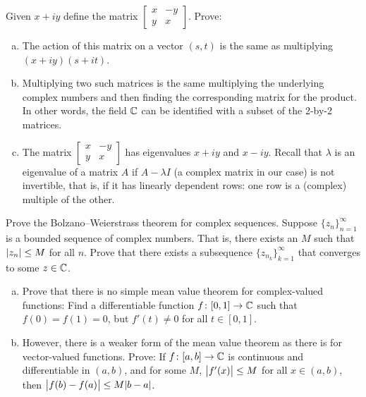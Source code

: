 \begin{samepage}
\begin{exercise}
Given $x +iy$ define the matrix
$\left[ \begin{smallmatrix} x & -y \\ y & x \end{smallmatrix} \right]$.
Prove:
\begin{enumerate}[a)]
\item
The action of this matrix on a vector $(s,t)$ is the same
as multiplying $(x+iy)(s+it)$.
\item
Multiplying two such matrices is the same multiplying the underlying complex
numbers and then finding the corresponding matrix for the product.
In other words, the field ${\mathbb{C}}$ can be identified with a subset of the 2-by-2 matrices.
\item
The matrix
$\left[ \begin{smallmatrix} x & -y \\ y & x \end{smallmatrix} \right]$
has eigenvalues $x+iy$ and $x-iy$.  Recall that $\lambda$ is
an eigenvalue of a matrix $A$ if $A-\lambda I$ (a complex matrix in our case)
is not invertible, that is,
if it has linearly dependent rows: one row is a (complex) multiple
of the other.
\end{enumerate}
\end{exercise}
\end{samepage}

\begin{exercise}
Prove the Bolzano--Weierstrass theorem for complex sequences.
Suppose $\{ z_n \}_{n=1}^\infty$ is a bounded sequence of complex numbers.
That is, there exists an $M$ such that $\lvert {z_n} \rvert \leq M$ for all $n$.
Prove that there exists a subsequence $\{ z_{n_k} \}_{k=1}^\infty$
that converges to some $z \in {\mathbb{C}}$.
\end{exercise}

\begin{exercise}
\leavevmode
\begin{enumerate}[a)]
\item
Prove that there is no simple mean value theorem for complex-valued
functions:  Find a differentiable function $f \colon [0,1] \to {\mathbb{C}}$ such that
$f(0) = f(1) = 0$, but $f'(t) \neq 0$ for all $t \in [0,1]$.
\item
However, there is a weaker form of the mean value theorem as there is for vector-valued
functions.  Prove: If $f \colon [a,b] \to {\mathbb{C}}$ is continuous and differentiable in
$(a,b)$, and for some $M$, $\bigl\lvert {f'(x)} \bigr\rvert \leq M$ for all $x \in (a,b)$, then
$\bigl\lvert {f(b)-f(a)} \bigr\rvert \leq M \lvert {b-a} \rvert$.
\end{enumerate}
\end{exercise}

